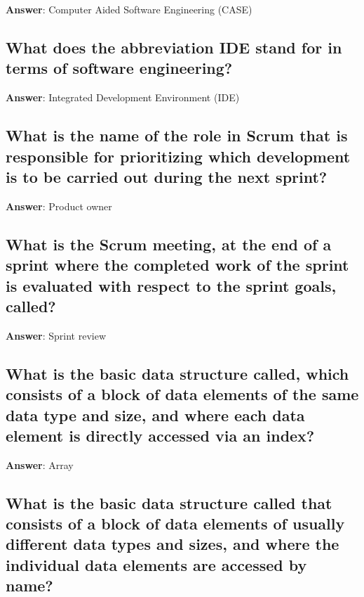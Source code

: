 \documentclass[a4paper,11pt,oneside]{article}
\begin{document}
\begin{sloppypar}
\label{q:47:sa:en:True}

\textbf{Answer}: Computer Aided Software Engineering (CASE)



\subsection{What does the abbreviation IDE stand for in terms of software engineering?}

\label{q:48:sa:en:True}

\textbf{Answer}: Integrated Development Environment (IDE)



\subsection{What is the name of the role in Scrum that is responsible for prioritizing which development is to be carried out during the next sprint?}

\label{q:49:sa:en:True}

\textbf{Answer}: Product owner



\subsection{What is the Scrum meeting, at the end of a sprint where the completed work of the sprint is evaluated with respect to the sprint goals, called?}

\label{q:50:sa:en:True}

\textbf{Answer}: Sprint review



\subsection{What is the basic data structure called, which consists of a block of data elements of the same data type and size, and where each data element is directly accessed via an index?}

\label{q:51:sa:en:True}

\textbf{Answer}: Array



\subsection{What is the basic data structure called that consists of a block of data elements of usually different data types and sizes, and where the individual data elements are accessed by name?}


\end{sloppypar}
\end{document}
